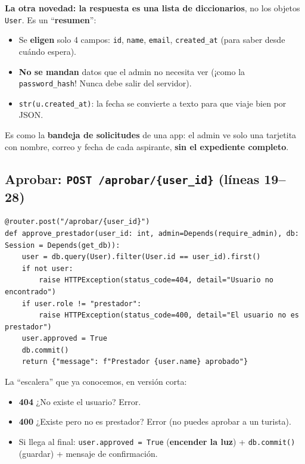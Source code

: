 \documentclass[11pt,a4paper]{article}
\begin{document}
\textbf{La otra novedad: la respuesta es una lista de diccionarios}, no los objetos \texttt{User}.
Es un ``\textbf{resumen}'':
\begin{itemize}
    \item Se \textbf{eligen} solo 4 campos: \texttt{id}, \texttt{name}, \texttt{email},
    \texttt{created\_at} (para saber desde cuándo espera).
    \item \textbf{No se mandan} datos que el admin no necesita ver (¡como la \texttt{password\_hash}!
    Nunca debe salir del servidor).
    \item \texttt{str(u.created\_at)}: la fecha se convierte a texto para que viaje bien por JSON.
\end{itemize}

\begin{analogia}
Es como la \textbf{bandeja de solicitudes} de una app: el admin ve solo una tarjetita con
nombre, correo y fecha de cada aspirante, \textbf{sin el expediente completo}.
\end{analogia}

\subsection{Aprobar: \texttt{POST /aprobar/\{user\_id\}} (líneas 19--28)}

\begin{lstlisting}
@router.post("/aprobar/{user_id}")
def approve_prestador(user_id: int, admin=Depends(require_admin), db: Session = Depends(get_db)):
    user = db.query(User).filter(User.id == user_id).first()
    if not user:
        raise HTTPException(status_code=404, detail="Usuario no encontrado")
    if user.role != "prestador":
        raise HTTPException(status_code=400, detail="El usuario no es prestador")
    user.approved = True
    db.commit()
    return {"message": f"Prestador {user.name} aprobado"}
\end{lstlisting}

La ``escalera'' que ya conocemos, en versión corta:
\begin{itemize}
    \item \textbf{404} ¿No existe el usuario? Error.
    \item \textbf{400} ¿Existe pero no es prestador? Error (no puedes aprobar a un turista).
    \item Si llega al final: \texttt{user.approved = True} (\textbf{encender la luz}) +
    \texttt{db.commit()} (guardar) + mensaje de confirmación.
\end{itemize}
\end{document}
